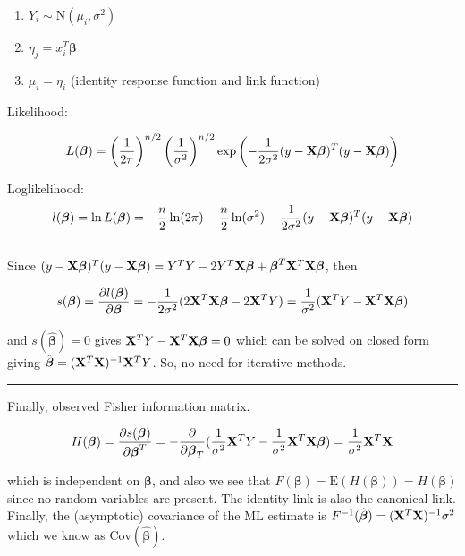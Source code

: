 \documentclass[
]{article}
\begin{document}
\begin{enumerate}
\def\labelenumi{\arabic{enumi}.}
\item
  \(Y_i \sim \text{N}(\mu_i, \sigma^2)\)
\item
  \(\eta_j = x_i^T\boldsymbol{\beta}\)
\item
  \(\mu_i = \eta_i\) (identity response function and link function)
\end{enumerate}

Likelihood:

\[L(\boldsymbol{\beta}) = \left(\frac{1}{2\pi}\right)^{n/2}\left(\frac{1}{\sigma^2}\right)^{n/2} \exp\left(-\frac{1}{2\sigma^2}(y-{\bf X}\boldsymbol{\beta})^T(y-{\bf X}\boldsymbol{\beta})\right)\]

Loglikelihood:
\[l(\boldsymbol{\beta}) = \ln L(\boldsymbol{\beta}) = -\frac{n}{2} \ln (2\pi) - \frac{n}{2} \ln (\sigma^2) - \frac{1}{2\sigma^2}(y-{\bf X}\boldsymbol{\beta})^T(y-{\bf X}\boldsymbol{\beta})\]

\begin{center}\rule{0.5\linewidth}{0.5pt}\end{center}

Since
\((y-{\bf X}\boldsymbol{\beta})^T(y-{\bf X}\boldsymbol{\beta}) = Y^TY - 2Y^T{\bf X}\boldsymbol{\beta} + \boldsymbol{\beta}^T{\bf X}^T{\bf X}\boldsymbol{\beta}\),
then

\[s(\boldsymbol{\beta}) = \frac{\partial l(\boldsymbol{\beta})}{\partial \boldsymbol{\beta}} = -\frac{1}{2\sigma^2}(2{\bf X}^T{\bf X}\boldsymbol{\beta}-2{\bf X}^TY) = \frac{1}{\sigma^2}({\bf X}^TY - {\bf X}^T{\bf X}\boldsymbol{\beta})\]

and \(s(\hat{\boldsymbol{\beta}}) = 0\) gives
\({\bf X}^TY - {\bf X}^T{\bf X}\boldsymbol{\beta} = 0\) which can be
solved on closed form giving
\(\hat{\boldsymbol{\beta}} = ({\bf X}^T{\bf X})^{-1}{\bf X}^TY\). So, no
need for iterative methods.

\begin{center}\rule{0.5\linewidth}{0.5pt}\end{center}

Finally, observed Fisher information matrix.

\[H(\boldsymbol{\beta}) = \frac{\partial s(\boldsymbol{\beta})}{\partial \boldsymbol{\beta}^T} = -\frac{\partial}{\partial \boldsymbol{\beta}_T}(\frac{1}{\sigma^2}{\bf X}^TY - \frac{1}{\sigma^2}{\bf X}^T{\bf X}\boldsymbol{\beta}) = \frac{1}{\sigma^2}{\bf X}^T{\bf X}\]

which is independent on \(\boldsymbol{\beta}\), and also we see that
\(F(\boldsymbol{\beta})=\text{E}(H(\boldsymbol{\beta}))=H(\boldsymbol{\beta})\)
since no random variables are present. The identity link is also the
canonical link. Finally, the (asymptotic) covariance of the ML estimate
is \(F^{-1}(\hat{\boldsymbol{\beta}})=({\bf X}^T{\bf X})^{-1}\sigma^2\)
which we know as \(\text{Cov}(\hat{\boldsymbol{\beta}})\).
\end{document}
